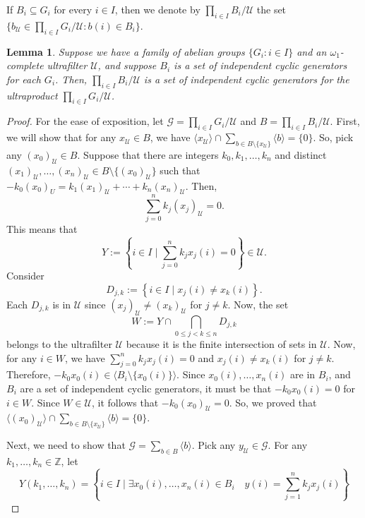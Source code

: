 \documentclass[a4paper]{amsart}
\newtheorem{lemma}[theorem]{Lemma}
\theoremstyle{definition}
\theoremstyle{remark}
\numberwithin{equation}{section}
\begin{document}
If $B_i \subseteq G_i$ for every $i \in I$, then we denote by $\prod_{i \in I} B_i / \mathcal{U}$ the set \(\{b_\mathcal{U} \in \prod_{i \in I} G_i / \mathcal{U} : b(i) \in B_i\}\).

\begin{lemma}
    \label{lem:ultraproduct-cyclic-groups}
    Suppose we have a family of abelian groups $\{G_i : i \in I\}$ and an $\omega_1$-complete ultrafilter $\mathcal{U}$, and suppose $B_i$ is a set of independent cyclic generators for each $G_i$. Then, $\prod_{i \in I} B_i / \mathcal{U}$ is a set of independent cyclic generators for the ultraproduct \(\prod_{i \in I} G_i / \mathcal{U}\).
\end{lemma}

\begin{proof}
For the ease of exposition, let \(\mathcal{G} = \prod_{i \in I} G_i / \mathcal{U}\) and \(B = \prod_{i \in I} B_i / \mathcal{U}\).
    First, we will show that for any $x_{\mathcal{U}} \in B$, we have $\langle x_{\mathcal{U}} \rangle \cap \sum_{b\in B\setminus\{ x_\mathcal{U}\}} \langle b \rangle = \{0\}$. So, pick any $(x_0)_{\mathcal{U}} \in B$. Suppose that there are integers $k_0, k_1, \dotsc, k_n$ and distinct $(x_1)_{\mathcal{U}}, \dotsc, (x_n)_{\mathcal{U}} \in B \setminus \{(x_0)_{\mathcal{U}}\}$ such that $-k_0 (x_0)_U = k_1 (x_1)_{\mathcal{U}} + \cdots + k_n(x_n)_{\mathcal{U}}$. Then,
    \[
        \sum_{j=0}^{n} k_j (x_j)_{\mathcal{U}} = 0.
    \]
    This means that
    \[
        Y := \left\{ i \in I \mid \sum_{j=0}^{n} k_j x_j(i) = 0 \right\} \in \mathcal{U}.
    \]
    Consider
    \[
        D_{j,k} := \left\{ i \in I \mid x_j(i) \neq x_k(i) \right\}.
    \]
    Each $D_{j,k}$ is in $\mathcal{U}$ since $(x_j)_{\mathcal{U}} \neq (x_k)_{\mathcal{U}}$ for $j \neq k$. Now, the set
    \[
        W := Y \cap \bigcap_{0 \leq j < k \leq n} D_{j,k}
    \]
    belongs to the ultrafilter $\mathcal{U}$ because it is the finite intersection of sets in $\mathcal{U}$. Now, for any $i \in W$, we have $\sum_{j=0}^{n} k_j x_j(i) = 0$ and $x_j(i) \neq x_k(i)$ for $j \neq k$. Therefore, $-k_0 x_0(i) \in \langle B_i \setminus \{x_0(i)\} \rangle$. Since $x_0(i), \dotsc, x_n(i)$ are in $B_i$, and $B_i$ are a set of independent cyclic generators, it must be that $-k_0 x_0 (i) = 0$ for $i \in W$. Since $W \in \mathcal{U}$, it follows that $-k_0 (x_0)_{\mathcal{U}} = 0$. So, we proved that $\langle (x_0)_{\mathcal{U}} \rangle \cap \sum_{b\in B\setminus\{ x_\mathcal{U}\}} \langle b \rangle = \{0\}$.

    Next, we need to show that $\mathcal{G} = \sum_{b\in B} \langle b \rangle$. Pick any $y_\mathcal{U} \in \mathcal{G}$. For any $k_1, \dots, k_n \in \mathbb{Z}$, let 
    \[
        Y(k_1, \dots, k_n) = \left\{ i \in I \mid \exists x_0(i), \dots, x_n(i) \in B_i \quad   y(i) = \sum^n_{j =1} k_j x_j(i) \right\}
    \]


\end{proof}
\end{document}
